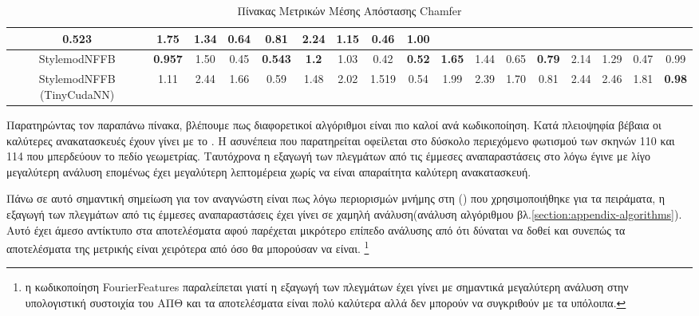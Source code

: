 \begin{table}[H]
{\begin{tabular}{c|cccccccccccccccc|}
  \multicolumn{1}{c|}{0.523} &
  \multicolumn{1}{c|}{1.75} &
  \multicolumn{1}{c|}{1.34} &
  \multicolumn{1}{c|}{\textbf{0.64}} &
  \multicolumn{1}{c|}{0.81} &
  \multicolumn{1}{c|}{2.24} &
  \multicolumn{1}{c|}{1.15} &
  \multicolumn{1}{c|}{\textbf{0.46}} &
  1.00 \\ \hline
\multicolumn{1}{|c|}{StylemodNFFB} &
  \multicolumn{1}{c|}{\textbf{0.957}} &
  \multicolumn{1}{c|}{1.50} &
  \multicolumn{1}{c|}{0.45} &
  \multicolumn{1}{c|}{\textbf{0.543}} &
  \multicolumn{1}{c|}{\textbf{1.2}} &
  \multicolumn{1}{c|}{1.03} &
  \multicolumn{1}{c|}{0.42} &
  \multicolumn{1}{c|}{\textbf{0.52}} &
  \multicolumn{1}{c|}{\textbf{1.65}} &
  \multicolumn{1}{c|}{1.44} &
  \multicolumn{1}{c|}{0.65} &
  \multicolumn{1}{c|}{\textbf{0.79}} &
  \multicolumn{1}{c|}{2.14} &
  \multicolumn{1}{c|}{1.29} &
  \multicolumn{1}{c|}{0.47} &
  0.99 \\ \hline
\multicolumn{1}{|c|}{StylemodNFFB (TinyCudaNN)} &
  \multicolumn{1}{c|}{1.11} &
  \multicolumn{1}{c|}{2.44} &
  \multicolumn{1}{c|}{1.66} &
  \multicolumn{1}{c|}{0.59} &
  \multicolumn{1}{c|}{1.48} &
  \multicolumn{1}{c|}{2.02} &
  \multicolumn{1}{c|}{1.519} &
  \multicolumn{1}{c|}{0.54} &
  \multicolumn{1}{c|}{1.99} &
  \multicolumn{1}{c|}{2.39} &
  \multicolumn{1}{c|}{1.70} &
  \multicolumn{1}{c|}{0.81} &
  \multicolumn{1}{c|}{2.44} &
  \multicolumn{1}{c|}{2.46} &
  \multicolumn{1}{c|}{1.81} &
  \textbf{0.98} \\ \hline
\end{tabular}%
}

\caption{Πίνακας Μετρικών Μέσης Απόστασης Chamfer}
\end{table}



Παρατηρώντας τον παραπάνω πίνακα, βλέπουμε πως διαφορετικοί αλγόριθμοι είναι πιο καλοί ανά κωδικοποίηση. Κατά πλειοψηφία βέβαια οι καλύτερες ανακατασκευές έχουν γίνει με το . Η ασυνέπεια που παρατηρείται οφείλεται στο δύσκολο περιεχόμενο φωτισμού των σκηνών 110 και 114 που μπερδεύουν το πεδίο γεωμετρίας. Ταυτόχρονα η εξαγωγή των πλεγμάτων από τις έμμεσες αναπαραστάσεις στο  λόγω έγινε με λίγο μεγαλύτερη ανάλυση επομένως έχει μεγαλύτερη λεπτομέρεια χωρίς να είναι απαραίτητα καλύτερη ανακατασκευή.

Πάνω σε αυτό σημαντική σημείωση για τον αναγνώστη είναι πως λόγω περιορισμών μνήμης στη () που χρησιμοποιήθηκε για τα πειράματα, η εξαγωγή των πλεγμάτων από τις έμμεσες αναπαραστάσεις έχει γίνει σε χαμηλή ανάλυση(ανάλυση αλγόριθμου  βλ.\ref{section:appendix-algorithms}). Αυτό έχει άμεσο αντίκτυπο στα αποτελέσματα αφού παρέχεται μικρότερο επίπεδο ανάλυσης από ότι δύναται να δοθεί και συνεπώς τα αποτελέσματα της μετρικής  είναι χειρότερα από όσο θα μπορούσαν να είναι. \footnote{η κωδικοποίηση FourierFeatures παραλείπεται γιατί η εξαγωγή των πλεγμάτων έχει γίνει με σημαντικά μεγαλύτερη ανάλυση στην υπολογιστική συστοιχία του ΑΠΘ και τα αποτελέσματα είναι πολύ καλύτερα αλλά δεν μπορούν να συγκριθούν με τα υπόλοιπα.}
\clearpage
